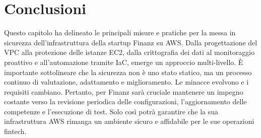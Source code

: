 \section{Conclusioni}
Questo capitolo ha delineato le principali misure e pratiche per la messa in sicurezza dell'infrastruttura della startup Finanz su AWS. Dalla progettazione del VPC alla protezione delle istanze EC2, dalla crittografia dei dati al monitoraggio proattivo e all'automazione tramite IaC, emerge un approccio multi-livello.
È importante sottolineare che la sicurezza non è uno stato statico, ma un processo continuo di valutazione, adattamento e miglioramento. Le minacce evolvono e i requisiti cambiano. Pertanto, per Finanz sarà cruciale mantenere un impegno costante verso la revisione periodica delle configurazioni, l'aggiornamento delle competenze e l'esecuzione di test. Solo così potrà garantire che la sua infrastruttura AWS rimanga un ambiente sicuro e affidabile per le sue operazioni fintech.
